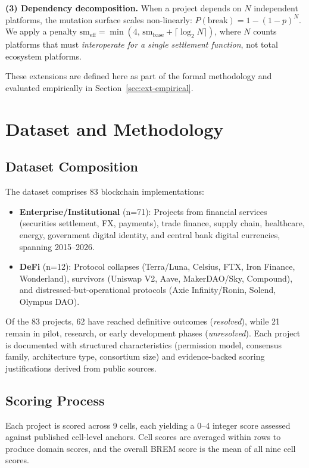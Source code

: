 \documentclass[conference]{IEEEtran}
\begin{document}
\textbf{(3) Dependency decomposition.} When a project depends on $N$ independent platforms, the mutation surface scales non-linearly: $P(\text{break}) = 1 - (1-p)^N$. We apply a penalty $\text{sm}_\text{eff} = \min(4,\, \text{sm}_\text{base} + \lceil\log_2 N\rceil)$, where $N$ counts platforms that must \textit{interoperate for a single settlement function}, not total ecosystem platforms.

These extensions are defined here as part of the formal methodology and evaluated empirically in Section~\ref{sec:ext-empirical}.

\section{Dataset and Methodology}

\subsection{Dataset Composition}

The dataset comprises 83 blockchain implementations:

\begin{itemize}
    \item \textbf{Enterprise/Institutional} (n=71): Projects from financial services (securities settlement, FX, payments), trade finance, supply chain, healthcare, energy, government digital identity, and central bank digital currencies, spanning 2015--2026.
    \item \textbf{DeFi} (n=12): Protocol collapses (Terra/Luna, Celsius, FTX, Iron Finance, Wonderland), survivors (Uniswap V2, Aave, MakerDAO/Sky, Compound), and distressed-but-operational protocols (Axie Infinity/Ronin, Solend, Olympus DAO).
\end{itemize}

Of the 83 projects, 62 have reached definitive outcomes (\textit{resolved}), while 21 remain in pilot, research, or early development phases (\textit{unresolved}). Each project is documented with structured characteristics (permission model, consensus family, architecture type, consortium size) and evidence-backed scoring justifications derived from public sources.

\subsection{Scoring Process}

Each project is scored across 9 cells, each yielding a 0--4 integer score assessed against published cell-level anchors. Cell scores are averaged within rows to produce domain scores, and the overall BREM score is the mean of all nine cell scores.
\end{document}
